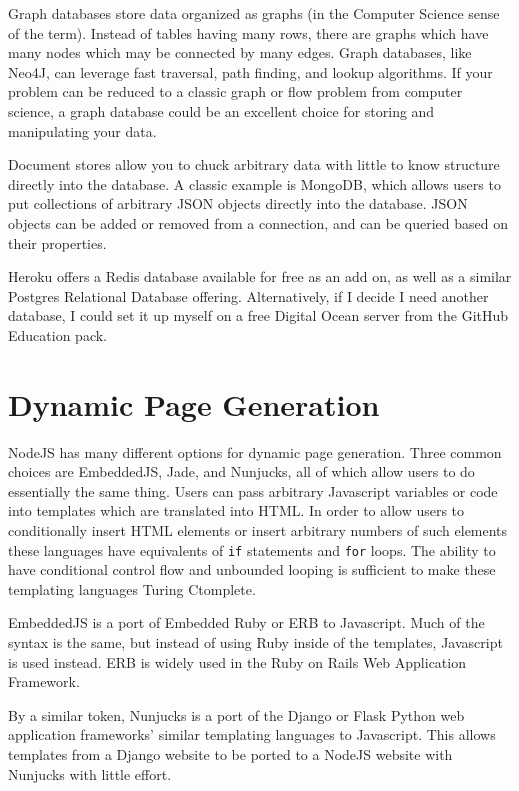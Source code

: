 \documentclass[12pt]{article}
\begin{document}
Graph databases store data organized as graphs (in the Computer Science sense of the term). Instead of tables having many rows, there are graphs which have many nodes which may be connected by many edges. Graph databases, like Neo4J, can leverage fast traversal, path finding, and lookup algorithms. If your problem can be reduced to a classic graph or flow problem from computer science, a graph database could be an excellent choice for storing and manipulating your data.

Document stores allow you to chuck arbitrary data with little to know structure directly into the database. A classic example is MongoDB, which allows users to put collections of arbitrary JSON objects directly into the database. JSON objects can be added or removed from a connection, and can be queried based on their properties.

Heroku offers a Redis database available for free as an add on, as well as a similar Postgres Relational Database offering. Alternatively, if I decide I need another database, I could set it up myself on a free Digital Ocean server from the GitHub Education pack.

\section{Dynamic Page Generation}
NodeJS has many different options for dynamic page generation. Three common choices are EmbeddedJS, Jade, and Nunjucks, all of which allow users to do essentially the same thing. Users can pass arbitrary Javascript variables or code into templates which are translated into HTML. In order to allow users to conditionally insert HTML elements or insert arbitrary numbers of such elements these languages have equivalents of \texttt{if} statements and \texttt{for} loops. The ability to have conditional control flow and unbounded looping is sufficient to make these templating languages Turing Ctomplete.

EmbeddedJS is a port of Embedded Ruby or ERB to Javascript. Much of the syntax is the same, but instead of using Ruby inside of the templates, Javascript is used instead. ERB is widely used in the Ruby on Rails Web Application Framework.

By a similar token, Nunjucks is a port of the Django or Flask Python web application frameworks' similar templating languages to Javascript. This allows templates from a Django website to be ported to a NodeJS website with Nunjucks with little effort.
\end{document}
